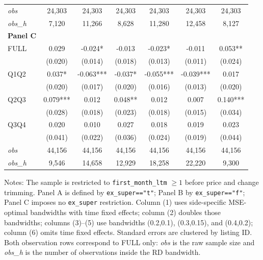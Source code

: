 \begin{table}[!htbp]
\begin{tabular}{lcccccc}
\textit{obs} & 24,303 & 24,303 & 24,303 & 24,303 & 24,303 & 24,303 \\
\textit{obs\_h} &  7,120 & 11,266 &  8,628 & 11,280 & 12,458 &  8,127 \\

\textbf{Panel C} &&&&&&  \\

FULL & 0.029 & -0.024* & -0.013 & -0.023* & -0.011 & 0.053** \\
 & (0.020) & (0.014) & (0.018) & (0.013) & (0.011) & (0.024) \\
Q1Q2 & 0.037* & -0.063*** & -0.037* & -0.055*** & -0.039*** & 0.017 \\
 & (0.020) & (0.017) & (0.020) & (0.016) & (0.013) & (0.020) \\
Q2Q3 & 0.079*** & 0.012 & 0.048** & 0.012 & 0.007 & 0.140*** \\
 & (0.028) & (0.018) & (0.023) & (0.018) & (0.015) & (0.034) \\
Q3Q4 & 0.020 & 0.010 & 0.027 & 0.018 & 0.019 & 0.023 \\
 & (0.041) & (0.022) & (0.036) & (0.024) & (0.019) & (0.044) \\

\textit{obs} & 44,156 & 44,156 & 44,156 & 44,156 & 44,156 & 44,156 \\
\textit{obs\_h} &  9,546 & 14,658 & 12,929 & 18,258 & 22,220 &  9,300 \\

\bottomrule
\end{tabular}
\begin{minipage}{0.98\textwidth}\footnotesize
Notes: The sample is restricted to \texttt{first\_month\_ltm} $\geq 1$ before price and change trimming. Panel A is defined by \texttt{ex\_super=="t"}; Panel B by \texttt{ex\_super=="f"}; Panel C imposes no \texttt{ex\_super} restriction. Column (1) uses side-specific MSE-optimal bandwidths with time fixed effects; column (2) doubles those bandwidths; columns (3)--(5) use bandwidths (0.2,0.1), (0.3,0.15), and (0.4,0.2); column (6) omits time fixed effects. Standard errors are clustered by listing ID. Both observation rows correspond to FULL only: \textit{obs} is the raw sample size and \textit{obs\_h} is the number of observations inside the RD bandwidth.
\end{minipage}
\end{table}
\clearpage

